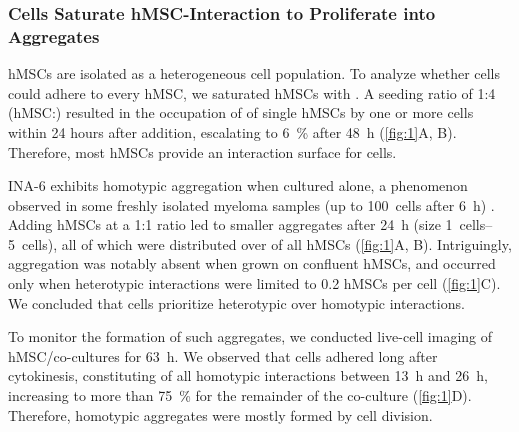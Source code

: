 \newpage





\label{C1:results}%
% 
% 
% 
\subsubsection*{\INA Cells Saturate hMSC-Interaction to Proliferate into Aggregates}%
\label{C1:results_saturation}%
hMSCs are isolated as a heterogeneous cell population. To analyze whether \INA
cells could adhere to every hMSC, we saturated hMSCs with \INA. A seeding ratio
of 1:4 (hMSC:\INA) resulted in the occupation of 
of single hMSCs by one or more \INA cells within 24 hours after \INA addition,
escalating to \SI{6}{\percent} after \SI{48}{\hour} (\autoref{fig:1}A, B).
Therefore, most hMSCs provide an interaction surface for \INA cells.

INA-6 exhibits homotypic aggregation when cultured alone, a phenomenon observed
in some freshly isolated myeloma samples (up to \SI{100}{cells} after
\SI{6}{\hour}) \cite{kawanoHomotypicCellAggregations1991a,
    okunoVitroGrowthPattern1991}. Adding hMSCs at a 1:1 ratio led to smaller
aggregates after \SI{24}{\hour} (size \SIrange{1}{5}{cells}), all of which were
distributed over  of all hMSCs (\autoref{fig:1}A,
B). Intriguingly, \INA aggregation was notably absent when grown on confluent
hMSCs, and occurred only when heterotypic interactions were limited to 0.2 hMSCs
per \INA cell (\autoref{fig:1}C). We concluded that \INA cells prioritize
heterotypic over homotypic interactions.

To monitor the formation of such aggregates, we conducted live-cell imaging of
\linebreak
hMSC/\INA co-cultures for \SI{63}{\hour}. We observed that \INA cells adhered
long after cytokinesis, constituting  of all
homotypic interactions between \SI{13}{\hour} and \SI{26}{\hour}, increasing to
more than \SI{75}{\percent} for the remainder of the co-culture
(\autoref{fig:1}D). Therefore, homotypic \INA aggregates were mostly formed by
cell division.

